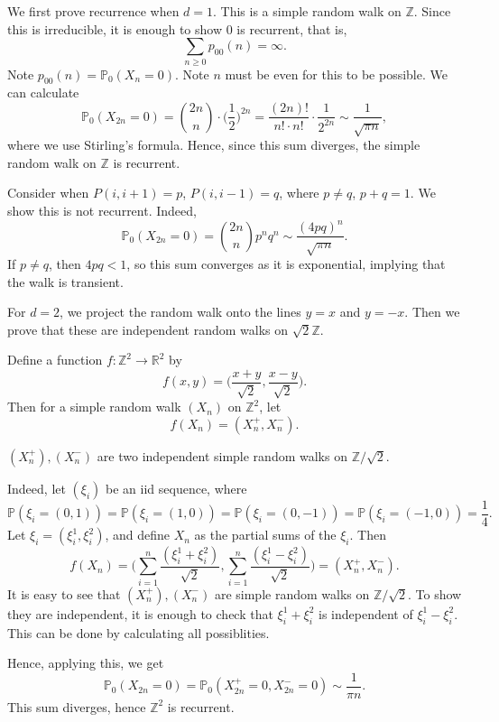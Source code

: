\documentclass[12pt]{article}
\begin{document}
\begin{proofbox}
	We first prove recurrence when $d = 1$. This is a simple random walk on $\mathbb{Z}$. Since this is irreducible, it is enough to show $0$ is recurrent, that is,
	\[
		\sum_{n \geq 0}p_{00}(n) = \infty
	.\]
	Note $p_{00}(n) = \mathbb{P}_0(X_n = 0)$. Note $n$ must be even for this to be possible. We can calculate
	\[
		\mathbb{P}_0(X_{2n} = 0) = \binom{2n}{n} \cdot \biggl( \frac{1}{2} \biggr)^{2n} = \frac{(2n)!}{n! \cdot n!} \cdot \frac{1}{2^{2n}} \sim \frac{1}{\sqrt{\pi n}}
	,\]
	where we use Stirling's formula. Hence, since this sum diverges, the simple random walk on $\mathbb{Z}$ is recurrent.

	Consider when $P(i, i+1) = p$, $P(i, i-1) = q$, where $p \neq q$, $p + q = 1$. We show this is not recurrent. Indeed,
	\[
		\mathbb{P}_0(X_{2n} = 0) = \binom{2n}{n} p^{n}q^{n} \sim \frac{(4pq)^{n}}{\sqrt{\pi n}}
	.\]
	If $p \neq q$, then $4pq < 1$, so this sum converges as it is exponential, implying that the walk is transient.

	For $d = 2$, we project the random walk onto the lines $y = x$ and $y = -x$. Then we prove that these are independent random walks on $\sqrt{2} \mathbb{Z}$.

	Define a function $f : \mathbb{Z}^2 \to \mathbb{R}^2$ by
	\[
		f(x, y) = \biggl( \frac{x + y}{\sqrt 2}, \frac{x - y}{\sqrt 2} \biggr)
	.\]
	Then for a simple random walk $(X_n)$ on $\mathbb{Z}^2$, let
	\[
		f(X_n) = (X_n^{+}, X_n^{-})
	.\]

\begin{theorem}
	$(X_{n}^{+}), (X_{n}^{-})$ are two independent simple random walks on $\mathbb{Z}/\sqrt 2$.
\end{theorem}

Indeed, let $(\xi_i)$ be an iid sequence, where
\[
	\mathbb{P}(\xi_i = (0, 1)) = \mathbb{P}(\xi_i = (1, 0)) = \mathbb{P}(\xi_i = (0, -1)) = \mathbb{P}(\xi_i = (-1, 0)) = \frac{1}{4}
.\]
Let $\xi_i = (\xi_i^{1}, \xi_i^{2})$, and define $X_n$ as the partial sums of the $\xi_i$. Then
\[
	f(X_n) = \Biggl( \sum_{i = 1}^{n} \frac{(\xi_i^{1} + \xi_i^{2})}{\sqrt 2}, \sum_{i = 1}^{n} \frac{(\xi_i^{1} - \xi_i^{2})}{\sqrt 2} \Biggr) = (X_{n}^{+}, X_{n}^{-})
.\]
It is easy to see that $(X_n^{+}), (X_{n}^{-})$ are simple random walks on $\mathbb{Z}/\sqrt 2$. To show they are independent, it is enough to check that $\xi_i^{1} + \xi_i^{2}$ is independent of $\xi_i^{1} - \xi_i^{2}$. This can be done by calculating all possiblities.

Hence, applying this, we get
\[
	\mathbb{P}_0(X_{2n} = 0) = \mathbb{P}_0(X_{2n}^{+} = 0, X_{2n}^{-} = 0) \sim \frac{1}{\pi n}
.\]
This sum diverges, hence $\mathbb{Z}^2$ is recurrent.


\end{proofbox}
\end{document}

